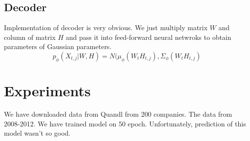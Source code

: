 \documentclass{article}
\begin{document}
\subsection{Decoder}
Implementation of decoder is very obvious. We just multiply matrix $W$ and column of matrix $H$ and pass it into feed-forward neural netwroks to obtain parameters of Gaussian parameters.
$$p_\phi(X_{t,j} |W, H) = N(\mu_\phi(W_t H_{t,j}), \Sigma_\phi (W_t H_{t,j})$$


\section{Experiments}

We have downloaded data from Quandl from 200 companies. The data from 2008-2012. We have trained model on 50 epoch. Unfortunately, prediction of this model wasn't so good. 






% 
% 
\end{document}
